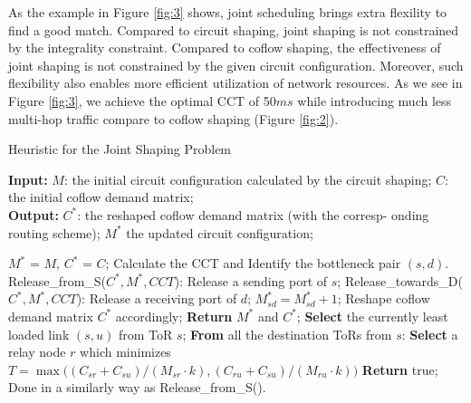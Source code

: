 As the example in Figure \ref{fig:3} shows, joint scheduling brings extra flexility to find a good match.
Compared to circuit shaping, joint shaping is not constrained by the integrality constraint.
Compared to coflow shaping, the effectiveness of joint shaping is not constrained by the given circuit configuration.
Moreover, such flexibility also enables more efficient utilization of network resources. As we see in Figure \ref{fig:3}, we achieve the optimal CCT of 50$ms$ while introducing much less multi-hop traffic compare to coflow shaping (Figure \ref{fig:2}).

\begin{algorithm}[!t]
\small
\caption{Heuristic for the Joint Shaping Problem}
\label{ALG-1}
\begin{flushleft}
\textbf{Input:} {$M$: the initial circuit configuration calculated by the circuit shaping;
$C$: the initial coflow demand matrix;
}\\
\textbf{Output:} {$C^*$: the reshaped coflow demand matrix (with the corresp- onding routing scheme);
$M^*$ the updated circuit configuration;}
\end{flushleft}
\begin{algorithmic}[1]
\label{algr:1}
  {}
\State $M^*$ = $M$, $C^*$ = $C$;  
 
   \State Calculate the CCT and Identify the bottleneck pair $(s, d)$.
   \State Release\_from\_S($C^*,M^*,CCT$): Release a sending port of $s$;
   \State  Release\_towards\_D($C^*,M^*,CCT$): Release a receiving port of $d$;
        \State $M^*_{sd} = M^*_{sd}+1$; 
        \State Reshape coflow demand matrix $C^*$ accordingly;
       \Else
       \State \textbf{Return} $M^*$ and $C^*$;
	\EndIf
\EndWhile
\EndProcedure
      \State \textbf{Select} the currently least loaded link $(s,u)$ from ToR $s$;
\State  \textbf{From} all the destination ToRs from $s$:
\State \textbf{Select} a relay node $r$ which minimizes $T = \max\big((C_{sr}+C_{su})/(M_{sr}\cdot k), (C_{ru}+C_{su})/(M_{ru} \cdot k)\big)$
  
\State \textbf{Return} true;
\EndIf
\EndProcedure
\State Done in a similarly way as Release\_from\_S().
\EndProcedure
\end{algorithmic}
\end{algorithm}

